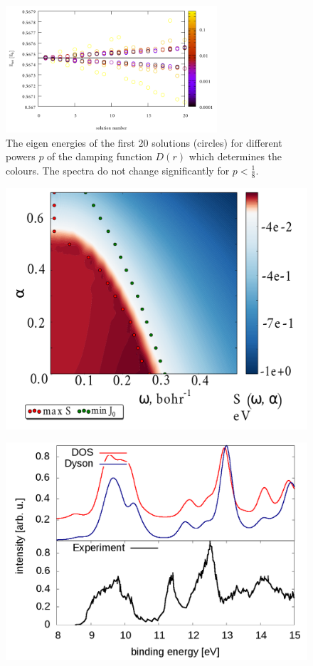 \begin{figure}
\includegraphics[width=0.7\textwidth]{Figures/IFem_powers_spectra}
\caption{The eigen energies of the first 20 solutions (circles) for different powers $p$ of the damping function $D(r)$ which determines the colours.
The spectra do not change significantly for $p<\frac 18$.}
\label{fig:powerSpect}
\end{figure}


\begin{figure}
\includegraphics[width=\textwidth]{Figures/Sulphur/S8_stab_ion_cut_all}
\caption{}
\label{fig:SulphurStab}
\end{figure}
\begin{figure}
\includegraphics[width=\textwidth]{Figures/Sulphur/Sulphur}
\end{figure}
